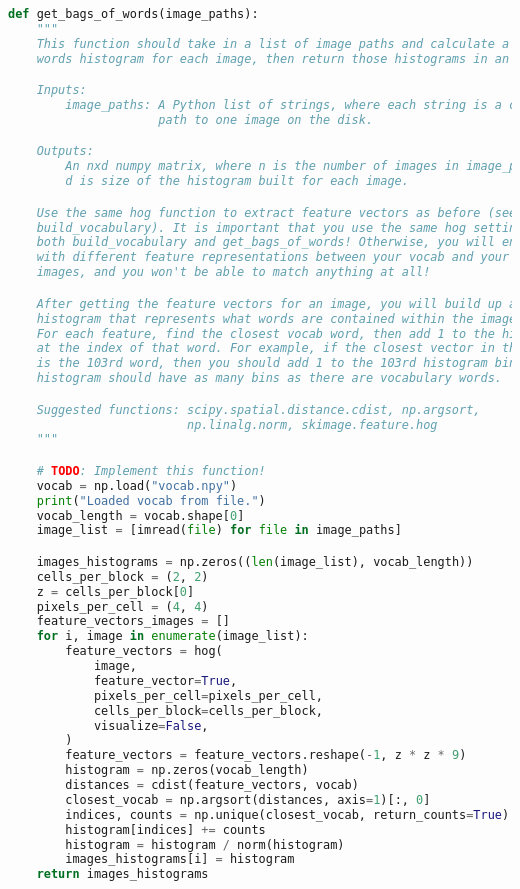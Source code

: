 \begin{lstlisting}[caption={student.py}, label={l:code-example}, captionpos=t, language=python]
def get_bags_of_words(image_paths):
    """
    This function should take in a list of image paths and calculate a bag of
    words histogram for each image, then return those histograms in an array.

    Inputs:
        image_paths: A Python list of strings, where each string is a complete
                     path to one image on the disk.

    Outputs:
        An nxd numpy matrix, where n is the number of images in image_paths and
        d is size of the histogram built for each image.

    Use the same hog function to extract feature vectors as before (see
    build_vocabulary). It is important that you use the same hog settings for
    both build_vocabulary and get_bags_of_words! Otherwise, you will end up
    with different feature representations between your vocab and your test
    images, and you won't be able to match anything at all!

    After getting the feature vectors for an image, you will build up a
    histogram that represents what words are contained within the image.
    For each feature, find the closest vocab word, then add 1 to the histogram
    at the index of that word. For example, if the closest vector in the vocab
    is the 103rd word, then you should add 1 to the 103rd histogram bin. Your
    histogram should have as many bins as there are vocabulary words.

    Suggested functions: scipy.spatial.distance.cdist, np.argsort,
                         np.linalg.norm, skimage.feature.hog
    """

    # TODO: Implement this function!
    vocab = np.load("vocab.npy")
    print("Loaded vocab from file.")
    vocab_length = vocab.shape[0]
    image_list = [imread(file) for file in image_paths]

    images_histograms = np.zeros((len(image_list), vocab_length))
    cells_per_block = (2, 2)
    z = cells_per_block[0]
    pixels_per_cell = (4, 4)
    feature_vectors_images = []
    for i, image in enumerate(image_list):
        feature_vectors = hog(
            image,
            feature_vector=True,
            pixels_per_cell=pixels_per_cell,
            cells_per_block=cells_per_block,
            visualize=False,
        )
        feature_vectors = feature_vectors.reshape(-1, z * z * 9)
        histogram = np.zeros(vocab_length)
        distances = cdist(feature_vectors, vocab)
        closest_vocab = np.argsort(distances, axis=1)[:, 0]
        indices, counts = np.unique(closest_vocab, return_counts=True)
        histogram[indices] += counts
        histogram = histogram / norm(histogram)
        images_histograms[i] = histogram
    return images_histograms



\end{lstlisting}
